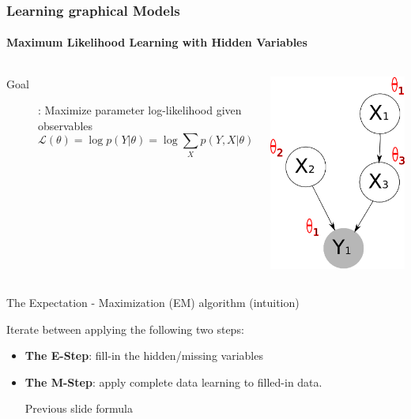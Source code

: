 \documentclass[slidestop,compress,mathserif]{beamer}
\begin{document}
\begin{frame}
	\frametitle{Learning graphical Models}
    \framesubtitle{Maximum Likelihood Learning with Hidden Variables}
	\begin{columns}[T]
	\begin{description}
	\item[Goal]: Maximize parameter log-likelihood given observables
	$$\mathcal{L}(\theta) = \log p(Y|\theta) = \log \sum_{X} p(Y,X|\theta)$$
	\end{description}
	\includegraphics[width=.8\textwidth]{g3}
	\end{columns}
	
	\begin{description}
	\item[The Expectation - Maximization (EM) algorithm (intuition)]
	\end{description}
	Iterate between applying the following two steps:
	\begin{itemize}
	\item \textbf{The E-Step}: fill-in the hidden/missing variables
	\item \textbf{The M-Step}: apply complete data learning to filled-in data.
	
		Previous slide formula 	
	\end{itemize}
\end{frame}
\end{document}
